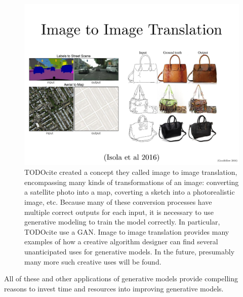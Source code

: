 \begin{figure}
  \centering
  \includegraphics[width=\textwidth]{im2im}
  \caption{
    TODOcite 
    created a concept they called {image to image translation},
    encompassing many kinds of transformations of an image:
    converting a satellite photo into a map,
    coverting a sketch into a photorealistic image,
    etc.
    Because many of these conversion processes have multiple
    correct outputs for each input, it is necessary to use
    generative modeling to train the model correctly.
    In particular, TODOcite use a GAN.
    Image to image translation provides many examples of how
    a creative algorithm designer can find several unanticipated uses
    for generative models.
    In the future, presumably many more such creative uses
    will be found.
  }
  \label{fig:im2im}
\end{figure}

All of these and other applications of generative models provide compelling
reasons to invest time and resources into improving generative models.

